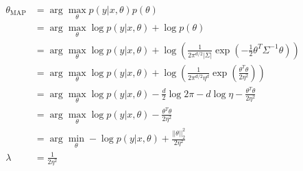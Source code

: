 \begin{answer}
    $$
    \begin{aligned}
        \theta_{\text{MAP}} 
        &=\arg\max_\theta p(y|x, \theta) p(\theta)\\
        &=\arg\max_\theta\log{p(y|x, \theta)} + \log{p(\theta)}\\
        &=\arg\max_\theta\log{p(y|x, \theta)} + \log{\left(\frac{1}{2\pi^{d/2}|\Sigma|}\exp{(-\frac{1}{2}\theta^T\Sigma^{-1}\theta)}\right)}\\
        &=\arg\max_\theta\log{p(y|x, \theta)} + \log{\left(\frac{1}{2\pi^{d/2}\eta^d}\exp{(\frac{\theta^T\theta}{2\eta^2})}\right)}\\
        &=\arg\max_\theta\log{p(y|x, \theta)} - \frac{d}{2}\log{2\pi}- d\log{\eta} - \frac{\theta^T\theta}{2\eta^2}\\
        &=\arg\max_\theta\log{p(y|x, \theta)} - \frac{\theta^T\theta}{2\eta^2}\\
        &=\arg\min_\theta -\log{p(y|x, \theta)} + \frac{||\theta||_2^2}{2\eta^2}\\
        \lambda &= \frac{1}{2\eta^2}
    \end{aligned}
    $$
\end{answer}
